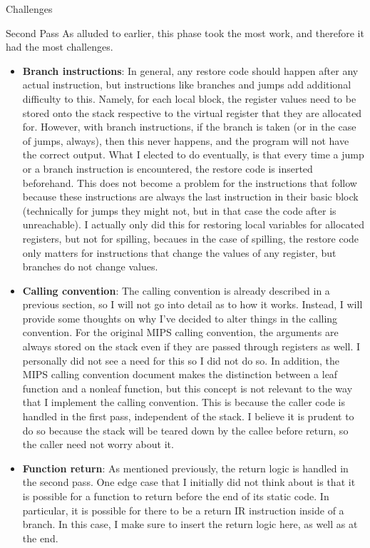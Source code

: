 \documentclass[letterpaper,12pt]{article}
\theoremstyle{definition}
\begin{document}
\begin{section}{Challenges}
        \begin{subsection}{Second Pass}
            As alluded to earlier, this phase took the most work, and therefore it had the most challenges.
            \begin{itemize}
                \item \textbf{Branch instructions}: In general, any restore code should happen after any actual instruction, but instructions like branches and jumps add additional difficulty to this. Namely, for each local block, the register values need to be stored onto the stack respective to the virtual register that they are allocated for. However, with branch instructions, if the branch is taken (or in the case of jumps, always), then this never happens, and the program will not have the correct output. What I elected to do eventually, is that every time a jump or a branch instruction is encountered, the restore code is inserted beforehand. This does not become a problem for the instructions that follow because these instructions are always the last instruction in their basic block (technically for jumps they might not, but in that case the code after is unreachable). I actually only did this for restoring local variables for allocated registers, but not for spilling, becaues in the case of spilling, the restore code only matters for instructions that change the values of any register, but branches do not change values.
                \item \textbf{Calling convention}: The calling convention is already described in a previous section, so I will not go into detail as to how it works. Instead, I will provide some thoughts on why I've decided to alter things in the calling convention. For the original MIPS calling convention, the arguments are always stored on the stack even if they are passed through registers as well. I personally did not see a need for this so I did not do so. In addition, the MIPS calling convention document makes the distinction between a leaf function and a nonleaf function, but this concept is not relevant to the way that I implement the calling convention. This is because the caller code is handled in the first pass, independent of the stack. I believe it is prudent to do so because the stack will be teared down by the callee before return, so the caller need not worry about it.
                \item \textbf{Function return}: As mentioned previously, the return logic is handled in the second pass. One edge case that I initially did not think about is that it is possible for a function to return before the end of its static code. In particular, it is possible for there to be a return IR instruction inside of a branch. In this case, I make sure to insert the return logic here, as well as at the end.
            \end{itemize}
        \end{subsection}
    \end{section}
\end{document}

